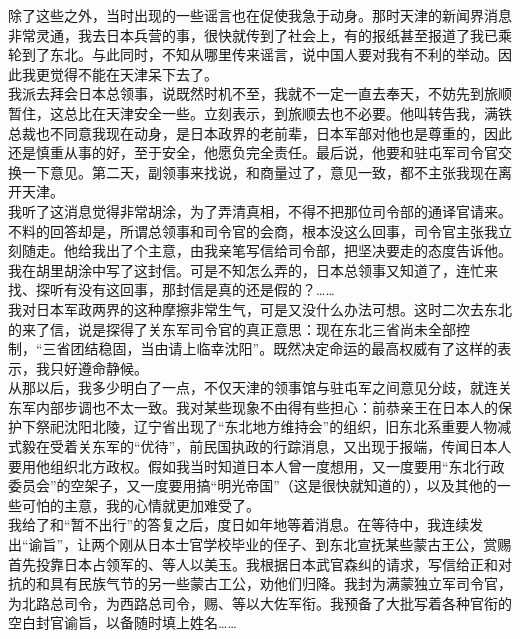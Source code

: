 除了这些之外，当时出现的一些谣言也在促使我急于动身。那时天津的新闻界消息非常灵通，我去日本兵营的事，很快就传到了社会上，有的报纸甚至报道了我已乘轮到了东北。与此同时，不知从哪里传来谣言，说中国人要对我有不利的举动。因此我更觉得不能在天津呆下去了。\\

我派去拜会日本总领事，说既然时机不至，我就不一定一直去奉天，不妨先到旅顺暂住，这总比在天津安全一些。立刻表示，到旅顺去也不必要。他叫转告我，满铁总裁也不同意我现在动身，是日本政界的老前辈，日本军部对他也是尊重的，因此还是慎重从事的好，至于安全，他愿负完全责任。最后说，他要和驻屯军司令官交换一下意见。第二天，副领事来找说，和商量过了，意见一致，都不主张我现在离开天津。\\

我听了这消息觉得非常胡涂，为了弄清真相，不得不把那位司令部的通译官请来。不料的回答却是，所谓总领事和司令官的会商，根本没这么回事，司令官主张我立刻随走。他给我出了个主意，由我亲笔写信给司令部，把坚决要走的态度告诉他。我在胡里胡涂中写了这封信。可是不知怎么弄的，日本总领事又知道了，连忙来找、探听有没有这回事，那封信是真的还是假的？……\\

我对日本军政两界的这种摩擦非常生气，可是又没什么办法可想。这时二次去东北的来了信，说是探得了关东军司令官的真正意思：现在东北三省尚未全部控制，“三省团结稳固，当由请上临幸沈阳”。既然决定命运的最高权威有了这样的表示，我只好遵命静候。\\

从那以后，我多少明白了一点，不仅天津的领事馆与驻屯军之间意见分歧，就连关东军内部步调也不太一致。我对某些现象不由得有些担心：前恭亲王在日本人的保护下祭祀沈阳北陵，辽宁省出现了“东北地方维持会”的组织，旧东北系重要人物减式毅在受着关东军的“优待”，前民国执政的行踪消息，又出现于报端，传闻日本人要用他组织北方政权。假如我当时知道日本人曾一度想用，又一度要用“东北行政委员会”的空架子，又一度要用搞“明光帝国”（这是很快就知道的），以及其他的一些可怕的主意，我的心情就更加难受了。\\

我给了和“暂不出行”的答复之后，度日如年地等着消息。在等待中，我连续发出“谕旨”，让两个刚从日本士官学校毕业的侄子、到东北宣抚某些蒙古王公，赏赐首先投靠日本占领军的、等人以美玉。我根据日本武官森纠的请求，写信给正和对抗的和具有民族气节的另一些蒙古工公，劝他们归降。我封为满蒙独立军司令官，为北路总司令，为西路总司令，赐、等以大佐军衔。我预备了大批写着各种官衔的空白封官谕旨，以备随时填上姓名……\\

